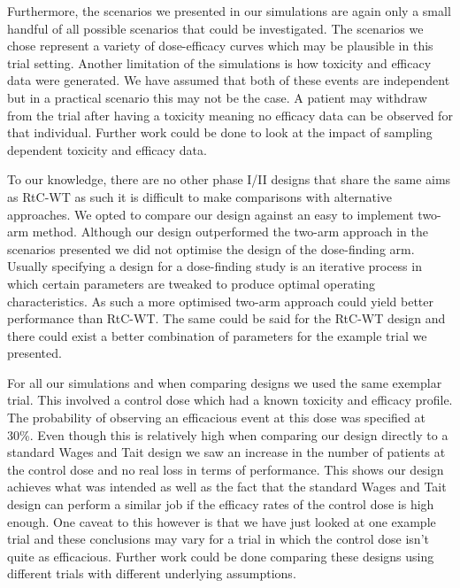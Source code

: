 Furthermore, the scenarios we presented in our simulations are again only a small handful of all possible scenarios that could be investigated. The scenarios we chose represent a variety of dose-efficacy curves which may be plausible in this trial setting. Another limitation of the simulations is how toxicity and efficacy data were generated. We have assumed that both of these events are independent but in a practical scenario this may not be the case. A patient may withdraw from the trial after having a toxicity meaning no efficacy data can be observed for that individual. Further work could be done to look at the impact of sampling dependent toxicity and efficacy data. 

To our knowledge, there are no other phase \RN{1}/\RN{2} designs that share the same aims as RtC-WT as such it is difficult to make comparisons with alternative approaches. We opted to compare our design against an easy to implement two-arm method. Although our design outperformed the two-arm approach in the scenarios presented we did not optimise the design of the dose-finding arm. Usually specifying a design for a dose-finding study is an iterative process in which certain parameters are tweaked to produce optimal operating characteristics. As such a more optimised two-arm approach could yield better performance than RtC-WT. The same could be said for the RtC-WT design and there could exist a better combination of parameters for the example trial we presented. 

For all our simulations and when comparing designs we used the same exemplar trial. This involved a control dose which had a known toxicity and efficacy profile. The probability of observing an efficacious event at this dose was specified at 30\%. Even though this is relatively high when comparing our design directly to a standard Wages and Tait design we saw an increase in the number of patients at the control dose and no real loss in terms of performance. This shows our design achieves what was intended as well as the fact that the standard Wages and Tait design can perform a similar job if the efficacy rates of the control dose is high enough. One caveat to this however is that we have just looked at one example trial and these conclusions may vary for a trial in which the control dose isn't quite as efficacious. Further work could be done comparing these designs using different trials with different underlying assumptions. 

